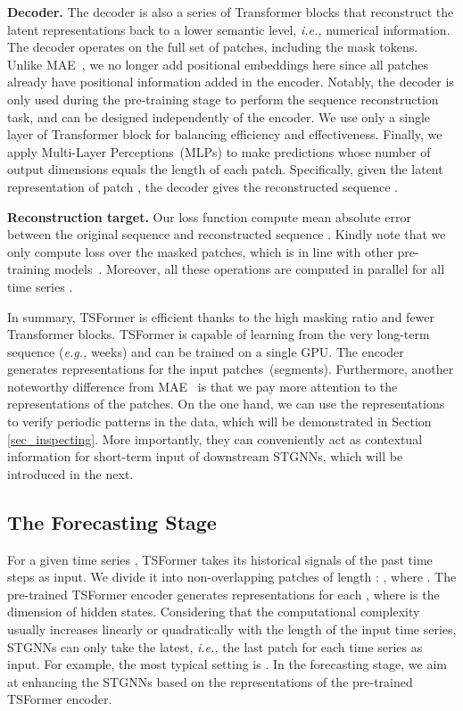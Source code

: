 \documentclass[sigconf]{acmart}
\newcommand{\eg}{\textit{e.g.,}\xspace}
\newcommand{\ie}{\textit{i.e.,}\xspace}
\begin{document}
\noindent \textbf{Decoder.} 
The decoder is also a series of Transformer blocks that reconstruct the latent representations back to a lower semantic level, \ie numerical information. 
The decoder operates on the full set of patches, including the mask tokens.
Unlike MAE~\cite{2021MAE}, we no longer add positional embeddings here since all patches already have positional information added in the encoder. 
Notably, the decoder is only used during the pre-training stage to perform the sequence reconstruction task, and can be designed independently of the encoder.
We use only a single layer of Transformer block for balancing efficiency and effectiveness.
{\color{black}
Finally, we apply Multi-Layer Perceptions~(MLPs) to make predictions whose number of output dimensions equals the length of each patch.
Specifically, given the latent representation  of patch , the decoder gives the reconstructed sequence .}

\noindent \textbf{Reconstruction target.}
Our loss function compute mean absolute error between the original sequence  and reconstructed sequence .
Kindly note that we only compute loss over the masked patches, which is in line with other pre-training models~\cite{2021MAE, 2019BERT}. Moreover, all these operations are computed in parallel for all time series .


In summary, TSFormer is efficient thanks to the high masking ratio and fewer Transformer blocks.
TSFormer is capable of learning from the very long-term sequence (\eg weeks) and can be trained on a single GPU.
The encoder generates representations for the input patches~(segments).
Furthermore, another noteworthy difference from MAE~\cite{2021MAE} is that we pay more attention to the representations of the patches. 
On the one hand, we can use the representations to verify periodic patterns in the data, which will be demonstrated in Section \ref{sec_inspecting}. 
More importantly, they can conveniently act as contextual information for short-term input of downstream STGNNs, which will be introduced in the next.


\subsection{The Forecasting Stage}
For a given time series , TSFormer takes its historical signals  of the past  time steps as input.
We divide it into  non-overlapping patches of length : , where .
The pre-trained TSFormer encoder generates representations  for each , where  is the dimension of hidden states.
Considering that the computational complexity usually increases linearly or quadratically with the length of the input time series, STGNNs can only take the latest, \ie the last patch  for each time series  as input.
For example, the most typical setting is .
In the forecasting stage, we aim at enhancing the STGNNs based on the representations of the pre-trained TSFormer encoder.
\end{document}
